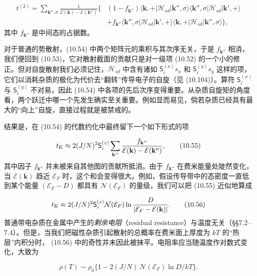 \begin{align*}
t^{(2)} = \sum_{\mathbf{k}'',\sigma} \frac{1}{\mathcal{E}(\mathbf{k}) - \mathcal{E}(\mathbf{k}'')} \big\{ &(1 - f_{\mathbf{k}''}) \langle \mathbf{k}, + | \mathcal{H}_{sd} | \mathbf{k}'', \sigma \rangle \langle \mathbf{k}'', \sigma | \mathcal{H}_{sd} | \mathbf{k}', + \rangle \\
&+ f_{\mathbf{k}''} \langle \mathbf{k}'', \sigma | \mathcal{H}_{sd} | \mathbf{k}', + \rangle \langle \mathbf{k}, + | \mathcal{H}_{sd} | \mathbf{k}'', \sigma \rangle \big\}, \tag{10.54}
\end{align*}
其中 $f_{\mathbf{k}''}$ 是中间态的占据数。

对于普通的势散射，(10.54) 中两个矩阵元的乘积与其次序无关，于是 $f_{\mathbf{k}''}$ 相消，我们便回到 (10.53)，它对散射截面的贡献只是对一级项 (10.52) 的一个小的修正。但对自旋散射我们必须记住，$\mathcal{H}_{sd}$ 中含有诸如 $\mathsf{S}_i^{(x)} s_x$ 和 $\mathsf{S}_i^{(y)} s_y$ 这样的项，它们以消耗杂质的极化为代价去“翻转”传导电子的自旋（见 (10.104)）。算符 $\mathsf{S}_i^{(x)}$ 与 $\mathsf{S}_i^{(y)}$ 不对易，因此 (10.54) 中各项的先后次序变得重要。从杂质自旋矩的角度看，两个跃迁中哪一个先发生确实至关重要。例如显而易见，倘若杂质已经具有最大的“向上”自旋，直接过程就是被禁戒的。

结果是，在 (10.54) 的代数约化中最终留下一个如下形式的项

\begin{equation*}
t_{\rm K} \approx 2(J/N)^2 \mathsf{S}_i^{(z)} \sum_{\mathbf{k}''} \frac{f_{\mathbf{k}''}}{\mathcal{E}(\mathbf{k}) - \mathcal{E}(\mathbf{k}'')}, \tag{10.55}
\end{equation*}
其中因子 $f_{\mathbf{k}''}$ 并未被来自其他图的贡献所抵消。由于 $f_{\mathbf{k}''}$ 在费米能量处陡然变化，当 $\mathcal{E}(\mathbf{k})$ 趋近 $\mathcal{E}_F$ 时，这个和会变得很大。例如，假设传导带中的态密度一直低到某个能量 $(\mathcal{E}_F - D)$ 都具有 $\mathcal{N}(\mathcal{E}_F)$ 的量级，我们可以把 (10.55) 近似地算成

\begin{equation*}
t_{\rm K} \approx 2(J/N)^2 \mathsf{S}_i^{(z)} \mathcal{N}(\mathcal{E}_F) \ln \frac{D}{|\mathcal{E}_F - \mathcal{E}(\mathbf{k})|}. \tag{10.56}
\end{equation*}
普通带电杂质在金属中产生的\emph{剩余电阻}（residual resistance）与温度无关（§§7.2--7.4）。但是，当我们把磁性杂质引起散射的总概率在费米面上厚度为 $kT$ 的“热层”内积分时，
(10.56) 中的奇性并未因此被抹平。电阻率应当随温度作对数式变化，大致为

\begin{equation*}
\rho(T) \sim \rho_0 \{1 - 2(J/N)\,\mathcal{N}(\mathcal{E}_F) \ln D/kT\}. \tag{10.57}
\end{equation*}

